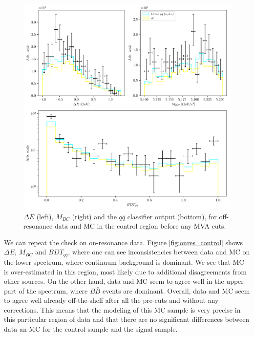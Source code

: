 \documentclass[headings=standardclasses,headings=big,oneside,a4paper,openany,12pt]{scrbook}
\begin{document}
\begin{figure}[H]
\centering
\captionsetup{width=0.8\linewidth}
\includegraphics[width=\linewidth]{fig/offres_control}
\caption{$\Delta E$ (left), $M_{BC}$ (right) and the $q \bar q$ classifier output (bottom), for off-resonance data and MC in the control region before any MVA cuts.}
\label{fig:offres_control}
\end{figure}


We can repeat the check on on-resonance data. Figure \ref{fig:onres_control} shows $\Delta E$, $M_{BC}$ and $BDT_{q \bar q}$, where one can see inconsistencies between data and MC on the lower spectrum, where continuum background is dominant. We see that MC is over-estimated in this region, most likely due to additional disagreements from other sources. On the other hand, data and MC seem to agree well in the upper part of the spectrum, where $B \bar B$ events are dominant. Overall, data and MC seem to agree well already off-the-shelf after all the pre-cuts and without any corrections. This means that the modeling of this MC sample is very precise in this particular region of data and that there are no significant differences between data an MC for the control sample and the signal sample.
\end{document}
